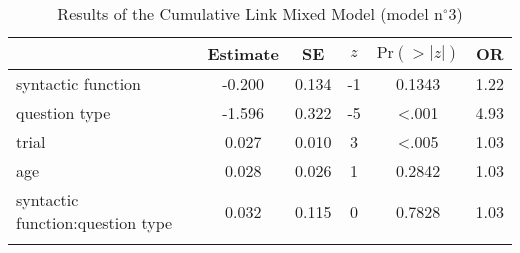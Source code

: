 \begin{table}
\begin{tabular}{l S[table-format=-1.3] S[table-format=1.3] S[table-format=-1.0] S[table-format=<1.4] S[table-format=1.2]}
  \lsptoprule
 & {Estimate} & {SE} & {$z$} & {$\text{Pr}(>|z|)$} & {OR} \\ 
  \midrule
  syntactic function               & -0.200 & 0.134 & -1 & 0.1343 & 1.22 \\ 
  question type                    & -1.596 & 0.322 & -5 & <.001 & 4.93 \\ 
  trial                            & 0.027  & 0.010 & 3 & <.005 & 1.03 \\ 
  age                              & 0.028  & 0.026 & 1 & 0.2842 & 1.03 \\ 
  syntactic function:question type & 0.032  & 0.115 & 0 & 0.7828 & 1.03 \\ 
   \lspbottomrule
\end{tabular}
\caption{Results of the Cumulative Link Mixed Model (model n$^{\circ}$3)}
\label{tab:exp11-m3}
\end{table}
